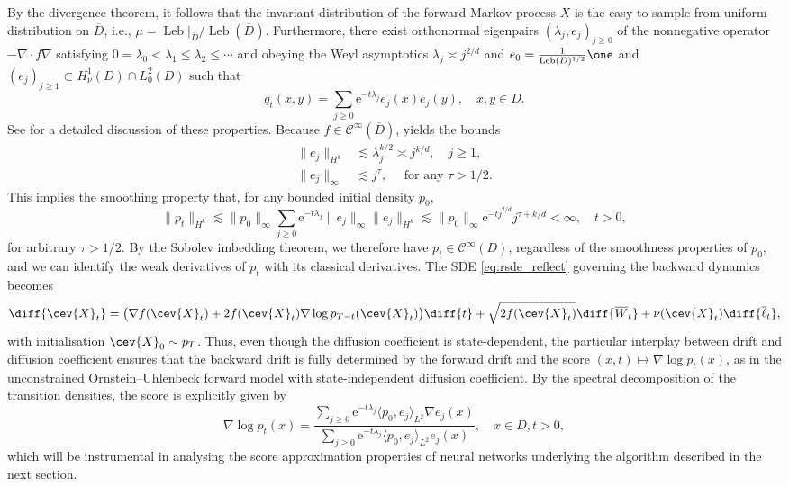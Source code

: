 \documentclass[a4paper, 11pt, headings = small, abstract]{scrartcl}
\begin{document}
By the divergence theorem, it follows that the invariant distribution of the forward Markov process $X$ is the easy-to-sample-from uniform distribution on $\overline{D}$, i.e., $\mu = \operatorname{Leb}\vert_{\overline{D}}/\operatorname{Leb}(\overline{D})$. Furthermore, there exist orthonormal eigenpairs $(\lambda_j, e_j)_{j \geq 0}$ of the nonnegative operator $-\nabla \cdot f\nabla$ satisfying $0= \lambda_0 < \lambda_1 \leq \lambda_2 \leq \cdots $ and obeying the Weyl asymptotics $\lambda_j \asymp j^{2/d}$ and $e_0 = \tfrac{1}{\operatorname{Leb}(D)^{1/2}} \one$ and $(e_j)_{j \geq 1} \subset H^1_\nu(D) \cap L^2_0(D)$ such that
\[q_t(x,y) = \sum_{j \geq 0} \mathrm{e}^{-t\lambda_j} e_j(x)e_j(y), \quad x,y \in D.\]
See \cite[Section 3]{nickl23} for a detailed discussion of these properties. 
Because $f \in \mathcal{C}^\infty(\overline{D})$, \cite[Corollary 1]{nickl23} yields the bounds
\begin{align*} 
\lVert e_j \rVert_{H^k} &\lesssim \lambda_j^{k/2} \asymp j^{k/d}, \quad j \geq 1,\\ 
\lVert e_j \rVert_\infty &\lesssim j^{\tau}, \quad \text{ for any } \tau > 1/2.
\end{align*}
This implies the smoothing property that, for any bounded initial density $p_0$, 
\[\lVert p_t \rVert_{H^k} \lesssim \lVert p_0 \rVert_\infty \sum_{j \geq 0} \mathrm{e}^{-t \lambda_j} \lVert e_j \rVert_\infty \lVert e_j \rVert_{H^k} \lesssim \lVert p_0 \rVert_\infty \mathrm{e}^{-t j^{2/d}} j^{\tau + k/d} < \infty, \quad t > 0,  \]
for arbitrary $\tau > 1/2$. By the Sobolev imbedding theorem, we therefore have $p_t \in \mathcal{C}^\infty(D)$, regardless of the smoothness properties of $p_0$, and we can identify the weak derivatives of $p_t$ with its classical derivatives.
The SDE \eqref{eq:rsde_reflect} governing the backward dynamics becomes
\[
\diff{\cev{X}_t} = \big(\nabla f(\cev{X}_t) + 2f(\cev{X}_t) \nabla\log p_{T-t}(\cev{X}_t) \big)\diff{t} + \sqrt{2f(\cev{X}_t)} \diff{\overline{W}_t} + \nu(\cev{X}_t) \diff{\overline{\ell}_t},
\]
with initialisation $\cev{X}_0 \sim p_T$. Thus, even though the diffusion coefficient is state-dependent, the particular interplay between drift and diffusion coefficient ensures that the backward drift is fully determined by the forward drift and the score $(x,t) \mapsto \nabla \log p_t(x)$, as in the unconstrained Ornstein--Uhlenbeck forward model with state-independent diffusion coefficient. 
By the spectral decomposition of the transition densities, the score is explicitly given by 
\begin{equation}\label{eq:score_spectral}
\nabla \log p_t(x) = \frac{\sum_{j \geq 0} \mathrm{e}^{-t\lambda_j} \langle p_0,e_j\rangle_{L^2} \nabla e_j(x)}{\sum_{j \geq 0} \mathrm{e}^{-t\lambda_j} \langle p_0,e_j\rangle_{L^2}   e_j(x)}, \quad x \in D, t > 0,
\end{equation}
which will be instrumental in analysing the score approximation properties of neural networks underlying the algorithm described in the next section.
\end{document}
